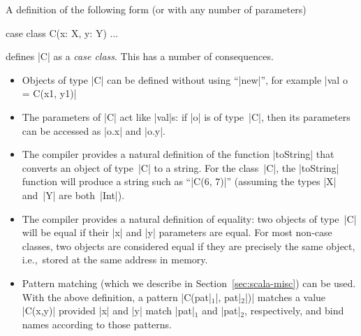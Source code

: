 A definition of the following form (or with any number of
parameters)
\begin{scala}
  case class C(x: X, y: Y) { ... }
\end{scala}
%
defines |C| as a \emph{case class}.  This has a number of
consequences.
\begin{itemize}
\item Objects of type |C| can be defined without using ``|new|'', for example
|val o = C(x1, y1)|

\item The parameters of |C| act like |val|s: if |o| is of type~|C|, then its
  parameters can be accessed as |o.x| and |o.y|.

\item The compiler provides a natural definition of the function
  |toString| that converts an object of type~|C| to a
  string.  For the class~|C|, the |toString| function will produce a string
  such as ``|C(6, 7)|'' (assuming the types |X| and~|Y| are both~|Int|).

\item The compiler provides a natural definition of equality: two objects of
  type~|C| will be equal if their |x| and |y| parameters are equal.  For most
  non-case classes,
  two objects are considered equal if they are precisely the same object,
  i.e.,~stored at the same address in memory. 


\item Pattern matching
  (which we describe in
  Section~\ref{sec:scala-misc}) can be used.  With the above definition, a
  pattern |C(pat|$_1$|, pat|$_2$|)| matches a value |C(x,y)| provided |x| and
  |y| match |pat|$_1$ and |pat|$_2$, respectively, and bind names according to
  those patterns.
\end{itemize}

